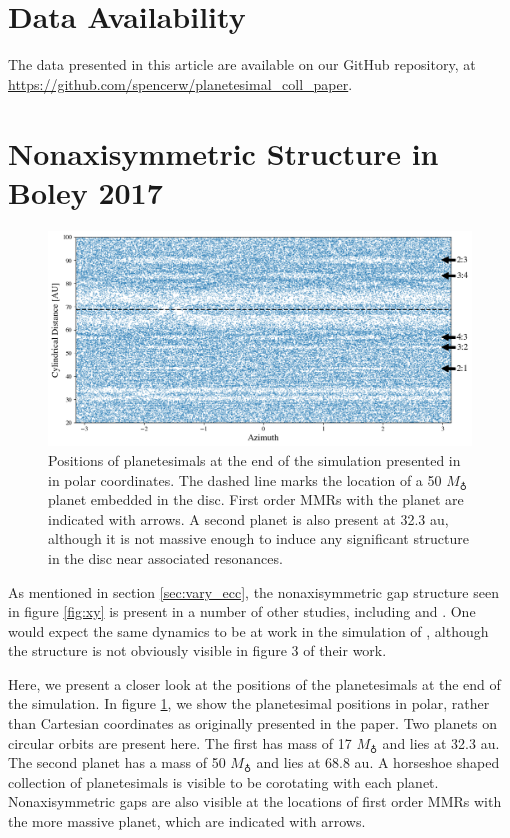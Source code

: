 \documentclass[fleqn,usenatbib]{mnras}
\begin{document}
\section*{Data Availability}
The data presented in this article are available on our GitHub repository, at \url{https://github.com/spencerw/planetesimal_coll_paper}.




\appendix
\section{Nonaxisymmetric Structure in Boley 2017}\label{sec:boley_plot}

\begin{figure}
    \includegraphics[width=\textwidth]{figures/boley_rtheta.png}
    \caption{Positions of planetesimals at the end of the simulation presented in \citet{2017ApJ...850..103B} in polar coordinates. The dashed line marks the location of a 50 $M_{\earth}$ planet embedded in the disc. First order MMRs with the planet are indicated with arrows. A second planet is also present at 32.3 au, although it is not massive enough to induce any significant structure in the disc near associated resonances.\label{fig:boley_rtheta}}
\end{figure}

As mentioned in section \ref{sec:vary_ecc}, the nonaxisymmetric gap structure seen in figure \ref{fig:xy} is present in a number of other studies,
including \citet{2000Icar..143...45R} and \citet{2016ApJ...818..159T}. One would expect the same dynamics to be at work in the simulation of 
\citet{2017ApJ...850..103B}, although the structure is not obviously visible in figure 3 of their work.

Here, we present a closer look at the positions of the planetesimals at the end of the \citet{2017ApJ...850..103B} simulation. In figure 
\ref{fig:boley_rtheta}, we show the planetesimal positions in polar, rather than Cartesian coordinates as originally presented in the paper. Two planets 
on circular orbits are present here. The first has mass of 17 $M_{\earth}$ and lies at 32.3 au. The second planet has a mass of 50 $M_{\earth}$ 
and lies at 68.8 au. A horseshoe shaped collection of planetesimals is visible to be corotating with each planet. Nonaxisymmetric gaps are also
visible at the locations of first order MMRs with the more massive planet, which are indicated with arrows.
\end{document}
